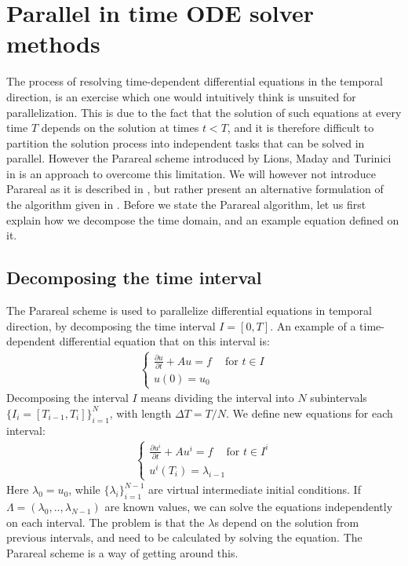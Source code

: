 \chapter{Parallel in time ODE solver methods} \label{parareal_chap}
The process of resolving time-dependent differential equations in the temporal direction, is an exercise which one would intuitively think is unsuited for parallelization. This is due to the fact that the solution of such equations at every time $T$ depends on the solution at times $t<T$, and it is therefore difficult to partition the solution process into independent tasks that can be solved in parallel. However the Parareal scheme introduced by Lions, Maday and Turinici in \cite{lions2001resolution}is an approach to overcome this limitation. We will however not introduce Parareal as it is described in \cite{lions2001resolution}, but rather present an alternative formulation of the algorithm given in \cite{baffico2002parallel}. Before we state the Parareal algorithm, let us first explain how we decompose the time domain, and an example equation defined on it.
\section{Decomposing the time interval} \label{Para_dcomp_sec}
The Parareal scheme is used to parallelize differential equations in temporal direction, by decomposing the time interval $I=[0,T]$. An example of a time-dependent differential equation that on this interval is:
\begin{align}
\left\{
   	\begin{array}{lr}
		\frac{\partial u}{\partial t} + Au = f \ \quad \textrm{for $t \in I$} \\
		u(0)=u_0
	\end{array}
   \right. \label{unbroken}
\end{align} 
Decomposing the interval $I$ means dividing the interval into $N$ subintervals $\{I_i = [T_{i-1},T_{i}]\}_{i=1}^{N}$, with length $\Delta T = T/N$. We define new equations for each interval:
\begin{align}
\left\{
     \begin{array}{lr}
		\frac{\partial u^i}{\partial t} + Au^i = f \ \quad \textrm{for $t \in I^i$} \\
		u^i(T_i)=\lambda_{i-1}
	\end{array}
	\right.	\label{broken}
\end{align}
Here $\lambda_0=u_0$, while $\{\lambda_i\}_{i=1}^{N-1}$ are virtual intermediate initial conditions. If $\Lambda=(\lambda_0,..,\lambda_{N-1})$ are known values, we can solve the equations independently on each interval. The problem is that the $\lambda$s depend on the solution from previous intervals, and need to be calculated by solving the equation. The Parareal scheme is a way of getting around this.
